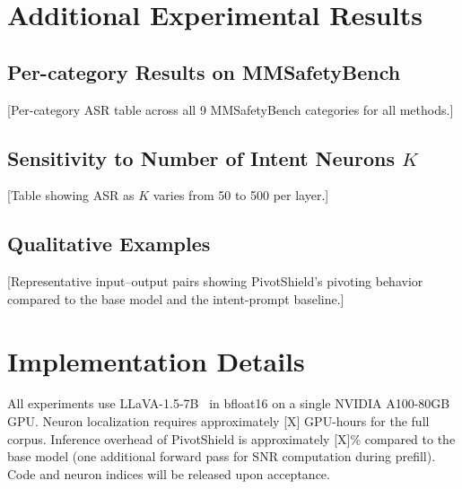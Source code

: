 \documentclass{article}
\newcommand{\method}{PivotShield\xspace}
\begin{document}
\section{Additional Experimental Results}
\label{app:additional}

\subsection{Per-category Results on MMSafetyBench}

[Per-category ASR table across all 9 MMSafetyBench categories
for all methods.]

\subsection{Sensitivity to Number of Intent Neurons $K$}

[Table showing ASR as $K$ varies from 50 to 500 per layer.]

\subsection{Qualitative Examples}

[Representative input--output pairs showing \method's
pivoting behavior compared to the base model and the
intent-prompt baseline.]

\section{Implementation Details}
\label{app:impl}

All experiments use LLaVA-1.5-7B~\citep{PLACEHOLDER_llava_verify}
in bfloat16 on a single NVIDIA A100-80GB GPU.
Neuron localization requires approximately [X] GPU-hours for
the full corpus.
Inference overhead of \method is approximately [X]\% compared to
the base model (one additional forward pass for SNR computation
during prefill).
Code and neuron indices will be released upon acceptance.
\end{document}
